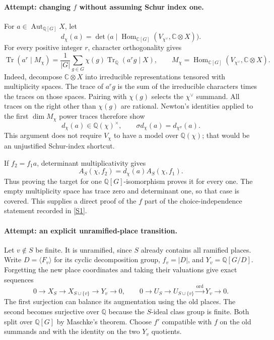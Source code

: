\documentclass[11pt,a4paper]{article}
\newcommand{\Q}{\mathbb{Q}}
\newcommand{\C}{\mathbb{C}}
\newcommand{\sref}[2]{\hyperlink{source:#1:#2}{[S#2]}}
\numberwithin{equation}{section}
\begin{document}
\paragraph{Attempt: changing $f$ without assuming Schur index one.}
For $a\in\operatorname{Aut}_{\Q[G]}X$, let
\begin{equation}
 d_\chi(a)=\det\bigl(a\mid
 \operatorname{Hom}_{\C[G]}(V_{\chi^\vee},\C\otimes X)\bigr).
\end{equation}
For every positive integer $r$, character orthogonality gives
\begin{equation}\label{statement:trace}
 \operatorname{Tr}(a^r\mid M_\chi)
 =\frac1{|G|}\sum_{g\in G}\chi(g)
   \operatorname{Tr}_{\Q}(a^r g\mid X),\qquad
 M_\chi=\operatorname{Hom}_{\C[G]}(V_{\chi^\vee},\C\otimes X).
\end{equation}
Indeed, decompose $\C\otimes X$ into irreducible representations tensored
with multiplicity spaces. The trace of $a^rg$ is the sum of the
irreducible characters times the traces on those spaces. Pairing with
$\chi(g)$ selects the $\chi^\vee$ summand. All traces on the right other
than $\chi(g)$ are rational. Newton's identities applied to the first
$\dim M_\chi$ power traces therefore show
\begin{equation}
 d_\chi(a)\in\Q(\chi)^\times,\qquad
 \sigma d_\chi(a)=d_{\chi^\sigma}(a).
\end{equation}
This argument does not require $V_\chi$ to have a model over $\Q(\chi)$;
that would be an unjustified Schur-index shortcut.

If $f_2=f_1a$, determinant multiplicativity gives
\begin{equation}
 A_S(\chi,f_2)=d_\chi(a)A_S(\chi,f_1).
\end{equation}
Thus proving the target for one $\Q[G]$-isomorphism proves it for every
one. The empty multiplicity space has trace zero and determinant one,
so that case is covered. This supplies a direct proof of the $f$ part
of the choice-independence statement recorded in \sref{statement}{1}.

\paragraph{Attempt: an explicit unramified-place transition.}
Let $v\notin S$ be finite. It is unramified, since $S$ already contains
all ramified places. Write $D=\langle F_v\rangle$ for its cyclic
decomposition group, $f_v=|D|$, and $Y_v=\Q[G/D]$. Forgetting the new
place coordinates and taking their valuations give exact sequences
\begin{equation}
 0\to X_S\to X_{S\cup\{v\}}\to Y_v\to0,
 \qquad
 0\to U_S\to U_{S\cup\{v\}}\xrightarrow{\operatorname{ord}}Y_v\to0.
\end{equation}
The first surjection can balance its augmentation using the old places.
The second becomes surjective over $\Q$ because the $S$-ideal class
group is finite. Both split over $\Q[G]$ by Maschke's theorem. Choose
$f'$ compatible with $f$ on the old summands and with the identity on
the two $Y_v$ quotients.
\end{document}
